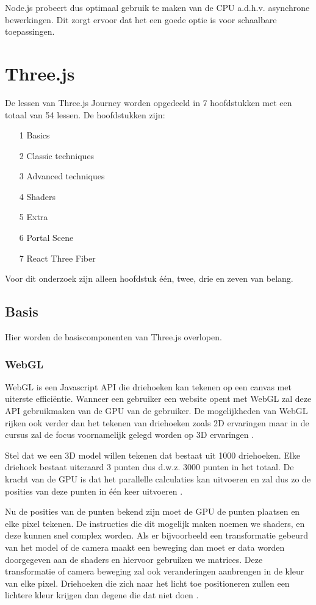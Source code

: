 Node.js probeert dus optimaal gebruik te maken van de CPU a.d.h.v. asynchrone bewerkingen. Dit zorgt ervoor dat het een goede optie is voor schaalbare toepassingen.

\newpage

\section{Three.js}

De lessen van Three.js Journey worden opgedeeld in 7 hoofdstukken met een totaal van 54 lessen. De hoofdstukken zijn:
\begin{itemize}
	\item[1] Basics
	\item[2] Classic techniques
	\item[3] Advanced techniques
	\item[4] Shaders
	\item[5] Extra
	\item[6] Portal Scene
	\item[7] React Three Fiber
\end{itemize}
Voor dit onderzoek zijn alleen hoofdstuk één, twee, drie en zeven van belang.

\subsection{Basis}

Hier worden de basiscomponenten van Three.js overlopen.

\subsubsection{WebGL}

WebGL is een Javascript API die driehoeken kan tekenen op een canvas met uiterste efficiëntie. Wanneer een gebruiker een website opent met WebGL zal deze API gebruikmaken van de GPU van de gebruiker. De mogelijkheden van WebGL rijken ook verder dan het tekenen van driehoeken zoals 2D ervaringen maar in de cursus zal de focus voornamelijk gelegd worden op 3D ervaringen \autocite{Simon2023}.

Stel dat we een 3D model willen tekenen dat bestaat uit 1000 driehoeken. Elke driehoek bestaat uiteraard 3 punten dus d.w.z. 3000 punten in het totaal. De kracht van de GPU is dat het parallelle calculaties kan uitvoeren en zal dus zo de posities van deze punten in één keer uitvoeren \autocite{Simon2023}.

Nu de posities van de punten bekend zijn moet de GPU de punten plaatsen en elke pixel tekenen. De instructies die dit mogelijk maken noemen we shaders, en deze kunnen snel complex worden. Als er bijvoorbeeld een transformatie gebeurd van het model of de camera maakt een beweging dan moet er data worden doorgegeven aan de shaders en hiervoor gebruiken we matrices. Deze transformatie of camera beweging zal ook veranderingen aanbrengen in de kleur van elke pixel. Driehoeken die zich naar het licht toe positioneren zullen een lichtere kleur krijgen dan degene die dat niet doen \autocite{Simon2023}.

